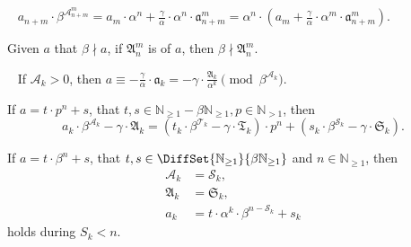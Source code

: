 \begin{corollary}~\label{corollary:inductive-formula-with-reduced}
    $a_{n+m} \cdot \beta^{\mathcal{A}_{n+m}^{m}} = a_{m} \cdot\alpha^{n} + \frac{\gamma}{\alpha}\cdot\alpha^{n}\cdot\mathfrak{a}_{n+m}^{m} = \alpha^{n}\cdot\left(a_m + \frac{\gamma}{\alpha}\cdot\alpha^{m}\cdot\mathfrak{a}_{n+m}^{m}\right)$.
\end{corollary}
\begin{corollary}
Given $a$ that $\beta \nmid a$, if $\mathfrak{A}_n^m$ is of $a$, then $\beta \nmid \mathfrak{A}_n^m$.
\end{corollary}
\begin{corollary}~\label{corollary:congerunce-with-collatz-complement}
If $\mathcal{A}_k > 0$, then $a \equiv - \frac{\gamma}{\alpha}\cdot\mathfrak{a}_k = -\gamma \cdot \frac{\mathfrak{A}_k}{\alpha^k} \pmod{\beta^{\mathcal{A}_k}}$.
\end{corollary}
\begin{corollary}
    If $a = t \cdot p^n + s$, that $t, s\in \mathbb{N}_{\ge1} - \beta\mathbb{N}_{\ge1}, p \in \mathbb{N}_{>1}$, then
    \[a_k \cdot \beta^{\mathcal{A}_k} - \gamma\cdot\mathfrak{A}_k = (t_k \cdot \beta^{\mathcal{T}_k} - \gamma\cdot\mathfrak{T}_k)\cdot p^{n} + (s_k \cdot \beta^{\mathcal{S}_k} - \gamma\cdot\mathfrak{S}_k).\]
\end{corollary}
\begin{corollary}
    If $a = t \cdot \beta^n + s$, that $t, s \in \DiffSet{\mathbb{N}_{\ge1}}{\beta\mathbb{N}_{\ge1}}$ and $n \in \mathbb{N}_{\ge1}$, then
    \begin{align*}
        \mathcal{A}_k &= \mathcal{S}_k, \\
        \mathfrak{A}_k &= \mathfrak{S}_k,\\
        a_k &= t \cdot \alpha^{k} \cdot \beta^{n-\mathcal{S}_k} + s_k
    \end{align*}
    holds during $S_k < n$.
\end{corollary}

